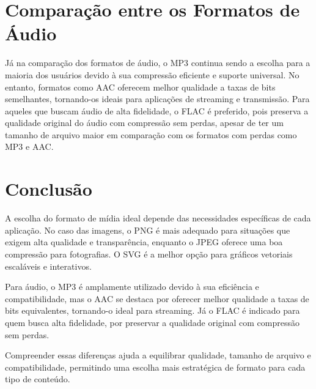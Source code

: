\documentclass[12pt]{report}
\begin{document}
	\section{Comparação entre os Formatos de Áudio}
	Já na comparação dos formatos de áudio, o MP3 continua sendo a escolha para a maioria dos usuários devido à sua compressão eficiente e suporte universal. No entanto, formatos como AAC oferecem melhor qualidade a taxas de bits semelhantes, tornando-os ideais para aplicações de streaming e transmissão. Para aqueles que buscam áudio de alta fidelidade, o FLAC é preferido, pois preserva a qualidade original do áudio com compressão sem perdas, apesar de ter um tamanho de arquivo maior em comparação com os formatos com perdas como MP3 e AAC.

	\section{Conclusão}
	A escolha do formato de mídia ideal depende das necessidades específicas de cada aplicação. No caso das imagens, o PNG é mais adequado para situações que exigem alta qualidade e transparência, enquanto o JPEG oferece uma boa compressão para fotografias. O SVG é a melhor opção para gráficos vetoriais escaláveis e interativos.
	
	Para áudio, o MP3 é amplamente utilizado devido à sua eficiência e compatibilidade, mas o AAC se destaca por oferecer melhor qualidade a taxas de bits equivalentes, tornando-o ideal para streaming. Já o FLAC é indicado para quem busca alta fidelidade, por preservar a qualidade original com compressão sem perdas.
	
	Compreender essas diferenças ajuda a equilibrar qualidade, tamanho de arquivo e compatibilidade, permitindo uma escolha mais estratégica de formato para cada tipo de conteúdo.
\end{document}
